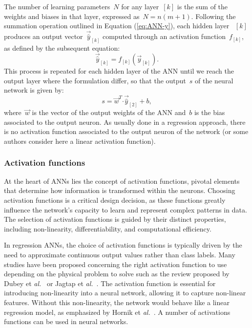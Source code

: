 \documentclass[algorithms,article,submit,pdftex,oneauthors]{Definitions/mdpi}
\makeatletter
\DeclareRobustCommand{\dotp}{\boldsymbol{\cdot}}
\DeclareRobustCommand{\lay}[1]{_{[#1]}}
\DeclareRobustCommand{\Lay}[1]{\mbox{$[#1]$}}
\DeclareRobustCommand{\eal}{et \emph{al.}\@\xspace}
\makeatother
\begin{document}
The number of learning parameters~$N$ for any layer~\Lay{k} is the sum of the weights and biases in that layer, expressed as~$N=n(m+1)$.
Following the summation operation outlined in Equation (\ref{eq:ANN-y}), each hidden layer ~\Lay{k} produces an output vector~$\overrightarrow{\hat{y}}\lay{k}$ computed through an activation function~$f\lay{k}$, as defined by the subsequent equation:
\begin{equation}
\overrightarrow{\hat{y}}\lay{k}=f\lay{k}(\overrightarrow{y}\lay{k}).
\label{eq:ANN-f}
\end{equation}
This process is repeated for each hidden layer of the ANN until we reach the output layer where the formulation differ, so that the output~$s$ of the neural network is given by:
\begin{equation}
s = \overrightarrow{w}^T \dotp \overrightarrow{\hat{y}}\lay{2} + b\label{eq:ANN-s},
\end{equation}
where~$\overrightarrow{w}$ is the vector of the output weights of the ANN and~$b$ is the bias associated to the output neuron.
As usually done in a regression approach, there is no activation function associated to the output neuron of the network (or some authors consider here a linear activation function).

\subsubsection{Activation functions}\label{subsubsec:ANN-act}

At the heart of ANNs lies the concept of activation functions, pivotal elements that determine how information is transformed within the neurons.
Choosing activation functions is a critical design decision, as these functions greatly influence the network's capacity to learn and represent complex patterns in data.
The selection of activation functions is guided by their distinct properties, including non-linearity, differentiability, and computational efficiency.

In regression ANNs, the choice of activation functions is typically driven by the need to approximate continuous output values rather than class labels.
Many studies have been proposed concerning the right activation function to use depending on the physical problem to solve such as the review proposed by Dubey \eal~\cite{Dubey-2022-AFD} or Jagtap \eal~\cite{Jagtap-2023-HIA}.
The activation function is essential for introducing non-linearity into a neural network, allowing it to capture non-linear features.
Without this non-linearity, the network would behave like a linear regression model, as emphasized by Hornik \eal~\cite{Hornik-1989-MFN}.
A number of activations functions can be used in neural networks.
\end{document}
